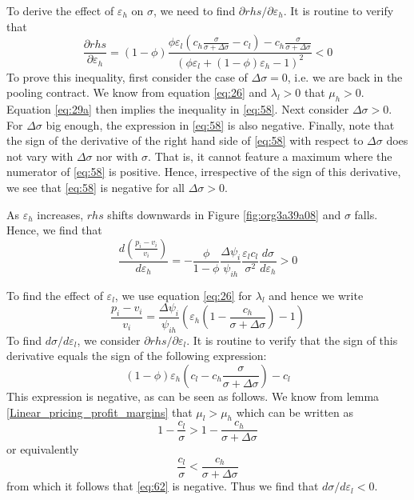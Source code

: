 \documentclass[12pt,english,a4paper]{article}
\begin{document}
To derive the effect of \(\varepsilon_h\) on \(\sigma\), we need to find \(\partial rhs/\partial \varepsilon_h\). It is routine to verify that
\begin{equation}
\label{eq:58}
\frac{\partial rhs}{\partial \varepsilon_h} =
(1-\phi) \frac{\phi \varepsilon_l (c_h \frac{\sigma}{\sigma+\Delta\sigma}-c_l)-c_h \frac{\sigma}{\sigma+\Delta\sigma}}{(\phi \varepsilon_l + (1-\phi)\varepsilon_h -1)^2} < 0
\end{equation}
To prove this inequality, first consider the case of \(\Delta \sigma=0\), i.e. we are back in the pooling contract. We know from equation \eqref{eq:26} and \(\lambda_l>0\) that \(\mu_h>0\). Equation \eqref{eq:29a} then implies the inequality in \eqref{eq:58}. Next consider \(\Delta \sigma > 0\). For \(\Delta \sigma\) big enough, the expression in \eqref{eq:58} is also negative. Finally, note that the sign of the derivative of the right hand side of \eqref{eq:58} with respect to \(\Delta \sigma\) does not vary with \(\Delta \sigma\) nor with \(\sigma\). That is, it cannot feature a maximum where the numerator of \eqref{eq:58} is positive. Hence, irrespective of the sign of this derivative, we see that \eqref{eq:58} is negative for all \(\Delta \sigma > 0\).

As \(\varepsilon_h\) increases, \(rhs\) shifts downwards in Figure \ref{fig:org3a39a08} and \(\sigma\) falls. Hence, we find that
\begin{equation}
\label{eq:45}
\frac{d\left(\frac{p_i-v_i}{v_i} \right)}{d \varepsilon_h} = - \frac{\phi}{1-\phi} \frac{\Delta \psi_i}{\psi_{ih}} \frac{\varepsilon_l c_l}{\sigma^2} \frac{d\sigma}{d\varepsilon_h} > 0
\end{equation}

To find the effect of \(\varepsilon_l\), we use equation \eqref{eq:26} for \(\lambda_l\) and hence we write
\begin{equation}
\label{eq:61}
\frac{p_i-v_i}{v_i} = \frac{\Delta\psi_i}{\psi_{ih}} \left(\varepsilon_h \left( 1-\frac{c_h}{\sigma+\Delta\sigma}\right)-1 \right)
\end{equation}
To find \(d\sigma/d\varepsilon_l\), we consider \(\partial rhs/\partial \varepsilon_l\). It is routine to verify that the sign of this derivative equals the sign of the following expression:
\begin{equation}
\label{eq:62}
(1-\phi) \varepsilon_h \left(c_l-c_h \frac{\sigma}{\sigma+\Delta\sigma} \right) - c_l
\end{equation}
This expression is negative, as can be seen as follows. We know from lemma \ref{Linear_pricing_profit_margins} that \(\mu_l>\mu_h\) which can be written as
\begin{equation}
\label{eq:70}
1-\frac{c_l}{\sigma} > 1-\frac{c_h}{\sigma+\Delta\sigma}
\end{equation}
or equivalently
\begin{equation}
\label{eq:71}
\frac{c_l}{\sigma} < \frac{c_h}{\sigma+\Delta\sigma}
\end{equation}
from which it follows that \eqref{eq:62} is negative. Thus we find that \(d\sigma/d\varepsilon_l<0\).
\end{document}
